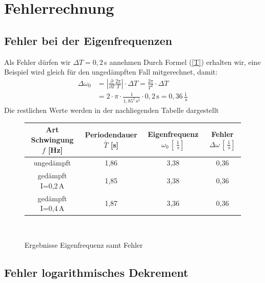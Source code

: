 \documentclass[fontsize=12pt]{scrartcl}
\renewcommand{\l}{\left\vert}
\renewcommand{\r}{\right\vert}
\begin{document}
\newpage

\section{Fehlerrechnung}

\subsection{Fehler bei der Eigenfrequenzen}

Als Fehler dürfen wir $\Delta T=0,2$\,s annehmen Durch Formel (\ref{T}) erhalten wir, eine Beispiel wird gleich für den ungedämpften Fall mitgerechnet, damit:
\begin{align*}
\Delta \omega_0 &=\l\frac{\partial}{\partial T}\frac{2\pi}{T}\r \cdot \Delta T = \frac{2\pi}{T^2} \cdot \Delta T \\
&=2\cdot \pi \cdot \frac{1}{1,85^2\,\text{s}^2} \cdot  0,2\,\text{s} =0,36\,\frac{1}{\,\text{s}}
\end{align*}
Die restlichen Werte werden in der nachliegenden Tabelle dargestellt
\begin{figure}[H]
\caption{Ergebnisse Eigenfrequenz samt Fehler}
\centering
\begin{tabular}{c|c|c|c} \hline
Art Schwingung $f$ [Hz] & Periodendauer $\bar{T} $	[s] & Eigenfrequenz $\omega_0\,[\,\frac{1}{\,\text{s}}]$  & Fehler $\Delta \omega \,[\,\frac{1}{\,\text{s}}]$ \\ \hline
ungedämpft &1,86	&3,38&0,36 \\ \hline
gedämpft I=0,2\,A&1,85&	3,38 &0,36\\ \hline
gedämpft I=0,4\,A&1,87&	3,36 &0,36\\
\end{tabular} \\
\end{figure}

\subsection{Fehler logarithmisches Dekrement}
\end{document}
